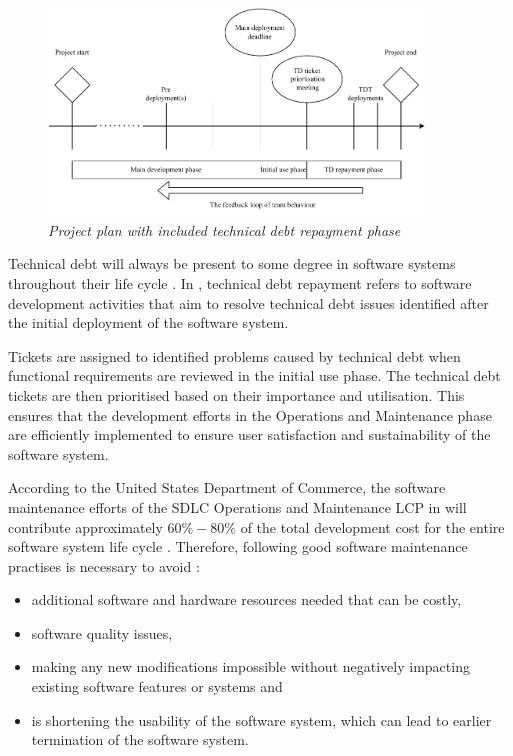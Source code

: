 \begin{figure}[!htb]
	\centering %
	\includegraphics[width=0.9\textwidth]{img/Chapter1/TD_repayment/TD_repayment.pdf}
	\caption[Project plan with included technical debt repayment phase]
	{\textit{Project plan with included technical debt repayment phase \cite{Wiese2021}}}\label{fig:ch1_tdRepayment}
\end{figure} 

Technical debt will always be present to some degree in software systems throughout their life cycle \cite{Wiese2021}. In , technical debt repayment refers to software development activities that aim to resolve technical debt issues identified after the initial deployment of the software system.\par Tickets are assigned to identified problems caused by technical debt when functional requirements are reviewed in the initial use phase. The technical debt tickets are then prioritised based on their importance and utilisation. This ensures that the development efforts in the Operations and Maintenance phase are efficiently implemented to ensure user satisfaction and sustainability of the software system.

\clearpage

According to the United States Department of Commerce, the software maintenance efforts of the SDLC Operations and Maintenance LCP in  will contribute approximately $60\%-80\%$ of the total development cost for the entire software system life cycle \cite{Ogheneovo2014, Ackermann2009, Tang2010}. Therefore, following good software maintenance practises is necessary to avoid \cite{DeLeon-Sigg2020}:

\begin{itemize}
	\item additional software and hardware resources needed that can be costly,
	\item software quality issues,
	\item making any new modifications impossible without negatively impacting existing software features or systems and
	\item is shortening the usability of the software system, which can lead to earlier termination of the software system.
\end{itemize}


